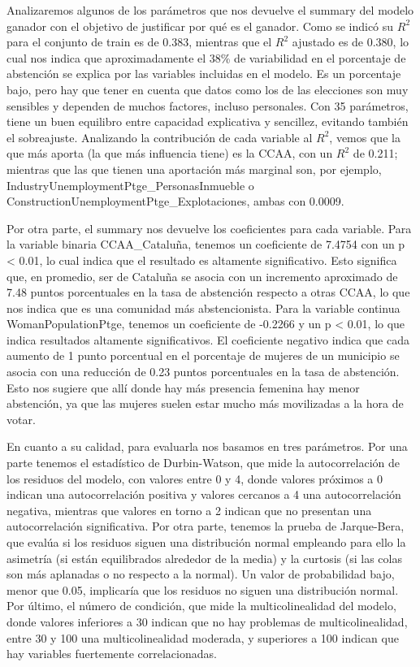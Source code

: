 \documentclass[a4paper,onecolumn]{extarticle}
\begin{document}
\begin{sloppypar}
Analizaremos algunos de los parámetros que nos devuelve el summary del modelo ganador con el objetivo de justificar por qué es el ganador. Como se indicó su 
$R^2$ para el conjunto de train es de 0.383, mientras que el $R^2$ ajustado es de 0.380, lo cual nos indica que aproximadamente el 38\% de variabilidad en el 
porcentaje de abstención se explica por las variables incluidas en el modelo. Es un porcentaje bajo, pero hay que tener en cuenta que datos como los de las 
elecciones son muy sensibles y dependen de muchos factores, incluso personales. Con 35 parámetros, tiene un buen equilibro entre capacidad explicativa y 
sencillez, evitando también el sobreajuste. Analizando la contribución de cada variable al $R^2$, vemos que la que más aporta (la que más influencia tiene) es 
la CCAA, con un $R^2$ de 0.211; mientras que las que tienen una aportación más marginal son, por ejemplo, IndustryUnemploymentPtge\_PersonasInmueble o 
ConstructionUnemploymentPtge\_Explotaciones, ambas con 0.0009.

Por otra parte, el summary nos devuelve los coeficientes para cada variable. Para la variable binaria CCAA\_Cataluña, tenemos un coeficiente de 7.4754 con un 
p < 0.01, lo cual indica que el resultado es altamente significativo. Esto significa que, en promedio, ser de Cataluña se asocia con un incremento aproximado
de 7.48 puntos porcentuales en la tasa de abstención respecto a otras CCAA, lo que nos indica que es una comunidad más abstencionista. Para la variable 
continua WomanPopulationPtge, tenemos un coeficiente de -0.2266 y un p < 0.01, lo que indica resultados altamente significativos. El coeficiente negativo indica 
que cada aumento de 1 punto porcentual en el porcentaje de mujeres de un municipio se asocia con una reducción de 0.23 puntos porcentuales en la tasa de 
abstención. Esto nos sugiere que allí donde hay más presencia femenina hay menor abstención, ya que las mujeres suelen estar mucho más movilizadas a la hora 
de votar.

En cuanto a su calidad, para evaluarla nos basamos en tres parámetros. Por una parte tenemos el estadístico de Durbin-Watson, que mide la autocorrelación de 
los residuos del modelo, con valores entre 0 y 4, donde valores próximos a 0 indican una autocorrelación positiva y valores cercanos a 4 una autocorrelación 
negativa, mientras que valores en torno a 2 indican que no presentan una autocorrelación significativa. Por otra parte, tenemos la prueba de Jarque-Bera, que 
evalúa si los residuos siguen una distribución normal empleando para ello la asimetría (si están equilibrados alrededor de la media) y la curtosis (si las colas 
son más aplanadas o no respecto a la normal). Un valor  de probabilidad bajo, menor que 0.05, implicaría que los residuos no siguen una distribución normal.
Por último, el número de condición, que mide la multicolinealidad del modelo, donde valores inferiores a 30 indican que no hay problemas de multicolinealidad, 
entre 30 y 100 una multicolinealidad moderada, y superiores a 100 indican que hay variables fuertemente correlacionadas.


\end{sloppypar}
\end{document}
